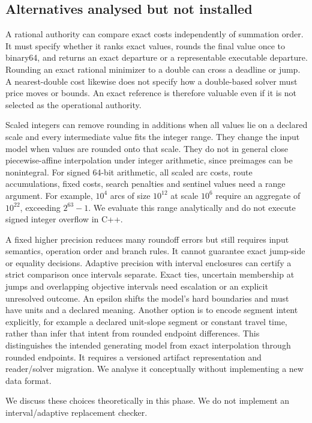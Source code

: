\subsection{Alternatives analysed but not installed}

A rational authority can compare exact costs independently of summation order. It must specify whether it ranks exact values, rounds the final value once to binary64, and returns an exact departure or a representable executable departure. Rounding an exact rational minimizer to a double can cross a deadline or jump. A nearest-double cost likewise does not specify how a double-based solver must price moves or bounds. An exact reference is therefore valuable even if it is not selected as the operational authority.

Scaled integers can remove rounding in additions when all values lie on a declared scale and every intermediate value fits the integer range. They change the input model when values are rounded onto that scale. They do not in general close piecewise-affine interpolation under integer arithmetic, since preimages can be nonintegral. For signed 64-bit arithmetic, all scaled arc costs, route accumulations, fixed costs, search penalties and sentinel values need a range argument. For example, $10^4$ arcs of size $10^{12}$ at scale $10^6$ require an aggregate of $10^{22}$, exceeding $2^{63}-1$. We evaluate this range analytically and do not execute signed integer overflow in C++.

A fixed higher precision reduces many roundoff errors but still requires input semantics, operation order and branch rules. It cannot guarantee exact jump-side or equality decisions. Adaptive precision with interval enclosures can certify a strict comparison once intervals separate. Exact ties, uncertain membership at jumps and overlapping objective intervals need escalation or an explicit unresolved outcome. An epsilon shifts the model's hard boundaries and must have units and a declared meaning. Another option is to encode segment intent explicitly, for example a declared unit-slope segment or constant travel time, rather than infer that intent from rounded endpoint differences. This distinguishes the intended generating model from exact interpolation through rounded endpoints. It requires a versioned artifact representation and reader/solver migration. We analyse it conceptually without implementing a new data format.

We discuss these choices theoretically in this phase. We do not implement an interval/adaptive replacement checker.


